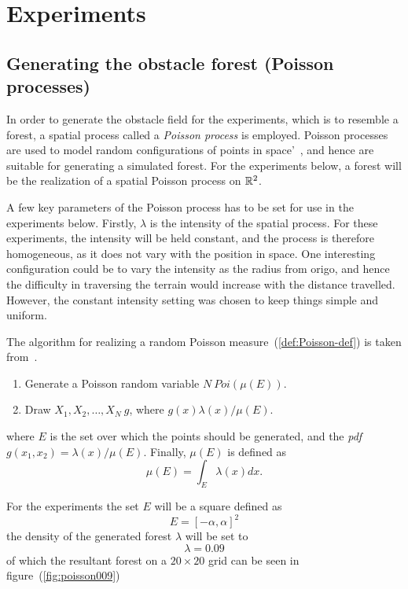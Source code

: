 \chapter{Experiments}

\section{Generating the obstacle forest (Poisson processes)}

In order to generate the obstacle field for the experiments, which is to
resemble a forest, a spatial process called a \textit{Poisson process} is
employed. Poisson processes are used to model random configurations of points in
space'~\cite{kroeseSpatialProcessGeneration}, and hence are suitable for
generating a simulated forest. For the experiments below, a forest will be the
realization of a spatial Poisson process on \(\mathbb{R}^2\).

A few key parameters of the Poisson process has to be set for use in the
experiments below. Firstly, \(\lambda\) is the intensity of the spatial process.
For these experiments, the intensity will be held constant, and the process is
therefore homogeneous, as it does not vary with the position in space. One
interesting configuration could be to vary the intensity as the radius from
origo, and hence the difficulty in traversing the terrain would increase with
the distance travelled. However, the constant intensity setting was chosen to
keep things simple and uniform.

The algorithm for realizing a random Poisson measure~(\ref{def:Poisson-def}) is
taken from~\cite[Definition 1.1.1,p~34]{kroeseSpatialProcessGeneration}.

\begin{definition}
  \label{def:Poisson-def}
  \begin{enumerate}
  \item Generate a Poisson random variable \(N ~ Poi(\mu(E))\).
  \item Draw \(X_1,X_2,\ldots,X_N ~ g\), where \(g(x) \lambda(x)/ \mu(E)\).
  \end{enumerate}
\end{definition}
where \(E\) is the set over which the points should be generated, and the
\textit{pdf} \(g(x_1, x_2) = \lambda(x)/\mu(E)\). Finally, \(\mu(E)\) is defined
as
\[
  \mu(E) = \int_{E} \lambda(x) dx.
\]

For the experiments the set \(E\) will be a square defined as
\[
  E = [-\alpha, \alpha]^2
\]
the density of the generated forest \(\lambda\) will be set to
\[
  \lambda = 0.09
\]
of which the resultant forest on a \(20 \times 20\) grid can be seen in
figure~(\ref{fig:poisson009})

